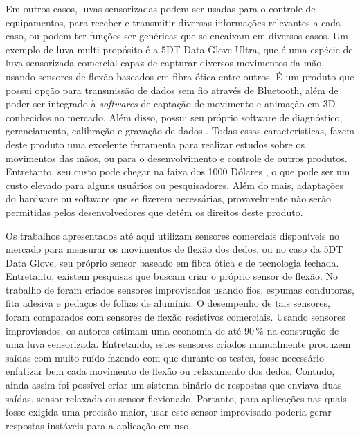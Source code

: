 \documentclass[
	12pt,				%
	openright,			%
	oneside,			%
	a4paper,			%
	english,			%
	brazil				%
	]{abntex2}
\begin{document}
		Em outros casos, luvas sensorizadas podem ser usadas para o controle de equipamentos, para receber e transmitir diversas informações relevantes a cada caso, ou podem ter funções ser genéricas que se encaixam em diversos casos. Um exemplo de luva multi-propósito é a 5DT Data Glove Ultra, que é uma espécie de luva sensorizada comercial capaz de capturar diversos movimentos da mão, usando sensores de flexão baseados em fibra ótica entre outros. É um produto que possui opção para transmissão de dados sem fio através de Bluetooth, além de poder ser integrado à \textit{softwares} de captação de movimento e animação em 3D conhecidos no mercado. Além disso, possui seu próprio software de diagnóstico, gerenciamento, calibração e gravação de dados \cite{5DT-ultra}. Todas essas características, fazem deste produto uma excelente ferramenta para realizar estudos sobre os movimentos das mãos, ou para o desenvolvimento e controle de outros produtos. Entretanto, seu custo pode chegar na faixa dos 1000 Dólares \cite{5DT-glove2019ebay}, o que pode ser um custo elevado para alguns usuários ou pesquisadores. Além do mais, adaptações do hardware ou software que se fizerem necessárias, provavelmente não serão permitidas pelos desenvolvedores que detém os direitos deste produto.

		Os trabalhos apresentados até aqui utilizam sensores comerciais disponíveis no mercado para mensurar os movimentos de flexão dos dedos, ou no caso da 5DT Data Glove, seu próprio sensor baseado em fibra ótica e de tecnologia fechada. Entretanto, existem pesquisas que buscam criar o próprio sensor de flexão. No trabalho de \cite{flores2014glovecontroller} foram criados sensores improvisados usando fios, espumas condutoras, fita adesiva e pedaços de folhas de alumínio. O desempenho de tais sensores, foram comparados com sensores de flexão resistivos comerciais. Usando sensores improvisados, os autores estimam uma economia de até 90$\,\%$ na construção de uma luva sensorizada. Entretando, estes sensores criados manualmente produzem saídas com muito ruído fazendo com que durante os testes, fosse necessário enfatizar bem cada movimento de flexão ou relaxamento dos dedos. Contudo, ainda assim foi possível criar um sistema binário de respostas que enviava duas saídas, sensor relaxado ou sensor flexionado. Portanto, para aplicações nas quais fosse exigida uma precisão maior, usar este sensor improvisado poderia gerar respostas instáveis para a aplicação em uso.


\end{document}
